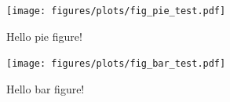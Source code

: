 \documentclass[a4paper,11pt]{article}
\begin{document}
  \begin{figure}[H]
    \begin{center}
      \vspace{-0.3cm}
      \texttt{[image: figures/plots/fig\_pie\_test.pdf]}
      \vspace{-0.5cm}
      \caption{Hello pie figure!}
    \end{center}
  \end{figure}

  \begin{figure}[H]
    \begin{center}
      \texttt{[image: figures/plots/fig\_bar\_test.pdf]}
      \caption{Hello bar figure!}
    \end{center}
  \end{figure}

\printbibliography
\end{document}
